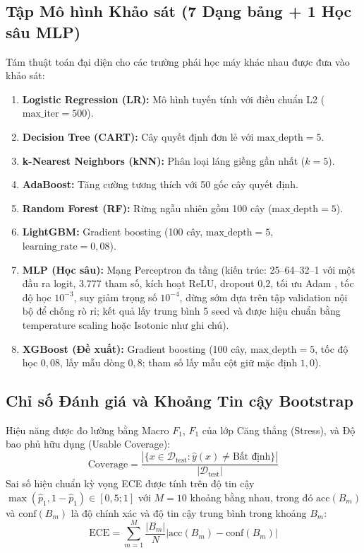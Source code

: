 \documentclass[conference]{IEEEtran}
\begin{document}
\subsection{Tập Mô hình Khảo sát (7 Dạng bảng + 1 Học sâu MLP)}
Tám thuật toán đại diện cho các trường phái học máy khác nhau được đưa vào khảo sát:
\begin{enumerate}
    \item \textbf{Logistic Regression (LR):} Mô hình tuyến tính với điều chuẩn L2 ($\text{max\_iter}=500$).
    \item \textbf{Decision Tree (CART):} Cây quyết định đơn lẻ \cite{breiman1984classification} với $\text{max\_depth}=5$.
    \item \textbf{k-Nearest Neighbors (kNN):} Phân loại láng giềng gần nhất \cite{cover1967nearest} ($k=5$).
    \item \textbf{AdaBoost:} Tăng cường tương thích \cite{freund1997decision} với 50 gốc cây quyết định.
    \item \textbf{Random Forest (RF):} Rừng ngẫu nhiên \cite{breiman2001random} gồm 100 cây ($\text{max\_depth}=5$).
    \item \textbf{LightGBM:} Gradient boosting \cite{ke2017lightgbm} (100 cây, $\text{max\_depth}=5$, $\text{learning\_rate}=0,08$).
    \item \textbf{MLP (Học sâu):} Mạng Perceptron đa tầng (kiến trúc: 25--64--32--1 với một đầu ra logit, 3.777 tham số, kích hoạt ReLU, dropout 0,2, tối ưu Adam \cite{kingma2015adam}, tốc độ học $10^{-3}$, suy giảm trọng số $10^{-4}$, dừng sớm dựa trên tập validation nội bộ để chống rò rỉ; kết quả lấy trung bình 5 seed và được hiệu chuẩn bằng temperature scaling hoặc Isotonic như ghi chú).
    \item \textbf{XGBoost (Đề xuất):} Gradient boosting (100 cây, $\text{max\_depth}=5$, tốc độ học $0,08$, lấy mẫu dòng $0,8$; tham số lấy mẫu cột giữ mặc định $1,0$).
\end{enumerate}

\subsection{Chỉ số Đánh giá và Khoảng Tin cậy Bootstrap}
Hiệu năng được đo lường bằng Macro $F_1$, $F_1$ của lớp Căng thẳng (Stress), và Độ bao phủ hữu dụng (Usable Coverage):
\begin{equation}
\text{Coverage} = \frac{|\{x \in \mathcal{D}_{\text{test}} : \hat{y}(x) \neq \text{Bất định}\}|}{|\mathcal{D}_{\text{test}}|}
\end{equation}
Sai số hiệu chuẩn kỳ vọng ECE \cite{naeini2015obtaining} được tính trên độ tin cậy $\max(\hat{p}_1, 1-\hat{p}_1)\in[0,5;1]$ với $M=10$ khoảng bằng nhau, trong đó $\text{acc}(B_m)$ và $\text{conf}(B_m)$ là độ chính xác và độ tin cậy trung bình trong khoảng $B_m$:
\begin{equation}
\text{ECE} = \sum_{m=1}^M \frac{|B_m|}{N} \left| \text{acc}(B_m) - \text{conf}(B_m) \right|
\end{equation}
\end{document}
